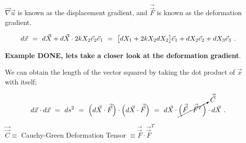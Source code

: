 \documentclass{article}
\begin{document}
 \begin{math} \vec{\nabla}\vec{u} \end{math} is known as the displacement gradient, and \begin{math} \vec{\vec{F}} \end{math} is known as the deformation gradient. 

\vspace{-1.0cm}

\begin{equation} \label{eq:1}
d \vec{x} \hspace{0.125cm} = \hspace{0.125cm} d \vec{X} + d \vec{X} \cdot 2 k X_2 \vec{e}_2 \vec{e}_1 \hspace{0.125cm} = \hspace{0.125cm} \big[ d X_1 + 2 k X_2 d X_2 \big] \vec{e}_1 + d X_2 \vec{e}_2 + d X_3 \vec{e}_3 \hspace{0.125cm} .
\end{equation} 

\textbf{Example DONE, lets take a closer look at the deformation gradient}. 

\vspace{1.5cm}

We can obtain the length of the vector squared by taking the dot product of \begin{math} \vec{x}  \end{math} with itself;

\vspace{-1.0cm}

\begin{equation} \label{eq:1}
d \vec{x} \cdot d \vec{x} \hspace{0.125cm} = \hspace{0.125cm} ds^2 \hspace{0.125cm} = \hspace{0.125cm} \Big( d \vec{X} \cdot \vec{\vec{F}} \Big) \cdot \Big( d \vec{X} \cdot \vec{\vec{F}} \Big) \hspace{0.125cm} = \hspace{0.125cm} d \vec{X} \cdot \cancelto{\vec{\vec{C}}}{\Big( \vec{\vec{F}} \cdot \vec{\vec{F}}^T \Big)} \cdot d \vec{X} \hspace{0.125cm} .
\end{equation} 

\begin{math} \vec{\vec{C}} \equiv \end{math} Cauchy-Green Deformation Tensor \begin{math}  \equiv \vec{\vec{F}} \cdot \vec{\vec{F}}^T \end{math}
\end{document}
